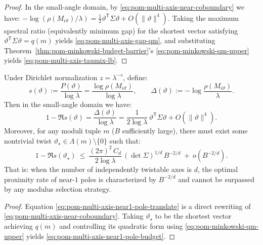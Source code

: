 \begin{proof}
In the small-angle domain, by \eqref{eq:pom-multi-axis-near-coboundary} we have:
\(
-\log(\rho(M_{i\vartheta})/\lambda)=\frac12\vartheta^{\mathsf T}\Sigma\vartheta+O(\|\vartheta\|^4)
\).
Taking the maximum spectral ratio (equivalently minimum gap) for the shortest vector satisfying $\vartheta^{\mathsf T}\Sigma\vartheta=q(m)$ yields \eqref{eq:pom-multi-axis-gap-qm}, and substituting Theorem~\ref{thm:pom-minkowski-budget-barrier}'s \eqref{eq:pom-minkowski-qm-upper} yields \eqref{eq:pom-multi-axis-taumix-lb}.
\end{proof}

\begin{corollary}\label{cor:pom-multi-axis-near1-pole-barrier}
Under Dirichlet normalization $z=\lambda^{-s}$, define:
\[
s(\vartheta):=\frac{P(\vartheta)}{\log\lambda}
=\frac{\log\rho(M_{i\vartheta})}{\log\lambda},
\qquad
\Delta(\vartheta):=-\log\frac{\rho(M_{i\vartheta})}{\lambda}.
\]
Then in the small-angle domain we have:
\begin{equation}\label{eq:pom-multi-axis-near1-pole-translate}
1-\Re s(\vartheta)=\frac{\Delta(\vartheta)}{\log\lambda}
=\frac{1}{2\log\lambda}\,\vartheta^{\mathsf T}\Sigma\vartheta+O(\|\vartheta\|^4).
\end{equation}
Moreover, for any moduli tuple $m$ ($B$ sufficiently large), there must exist some nontrivial twist $\vartheta_\star\in \Lambda(m)\setminus\{0\}$ such that:
\begin{equation}\label{eq:pom-multi-axis-near1-pole-budget}
1-\Re s(\vartheta_\star)
\ \le\
\frac{(2\pi)^2\,C_d}{2\log\lambda}\,(\det\Sigma)^{1/d}\,B^{-2/d}\ +\ o(B^{-2/d}).
\end{equation}
That is: when the number of independently twistable axes is $d$, the optimal proximity rate of near-$1$ poles is characterized by $B^{-2/d}$ and cannot be surpassed by any modulus selection strategy.
\end{corollary}

\begin{proof}
Equation \eqref{eq:pom-multi-axis-near1-pole-translate} is a direct rewriting of \eqref{eq:pom-multi-axis-near-coboundary}.
Taking $\vartheta_\star$ to be the shortest vector achieving $q(m)$ and controlling its quadratic form using \eqref{eq:pom-minkowski-qm-upper} yields \eqref{eq:pom-multi-axis-near1-pole-budget}.
\end{proof}

